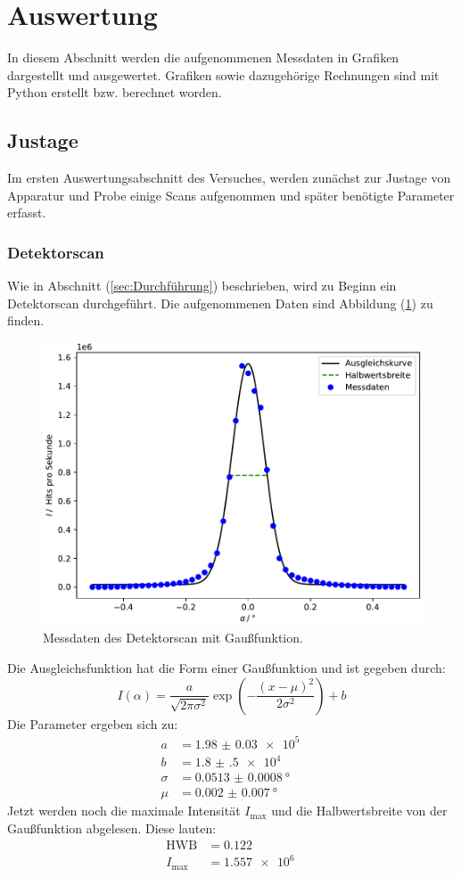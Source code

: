 \newpage
\section{Auswertung}
\label{sec:Auswertung}
In diesem Abschnitt werden die aufgenommenen Messdaten in Grafiken dargestellt und ausgewertet. Grafiken sowie dazugehörige Rechnungen sind mit Python \cite{python} erstellt bzw. berechnet worden.
\subsection{Justage}
Im ersten Auswertungsabschnitt des Versuches, werden zunächst zur Justage von Apparatur und Probe einige Scans aufgenommen und später benötigte Parameter erfasst.
\subsubsection{Detektorscan}
Wie in Abschnitt (\ref{sec:Durchführung}) beschrieben, wird zu Beginn ein Detektorscan durchgeführt. Die aufgenommenen Daten sind Abbildung (\ref{fig:detekscan}) zu finden.
\begin{figure}[h!]
  \centering
  \includegraphics[scale=0.7]{fig/plot_detektorscan.pdf}
  \caption{Messdaten des Detektorscan mit Gaußfunktion.}
  \label{fig:detekscan}
\end{figure}
Die Ausgleichsfunktion hat die Form einer Gaußfunktion und ist gegeben durch:
\begin{equation}
  \label{eqn:detektor}
  I(\alpha)=\dfrac{a}{\sqrt{2\pi\sigma^2}}\exp\left(-\dfrac{(x-\mu)^2}{2\sigma^2}\right)+b
\end{equation}
Die Parameter ergeben sich zu:
\begin{align*}
  a &= \SI{1.98(3) e5}{} \\
  b &= \SI{1.8(5) e4}{} \\
  \sigma &= \SI{0.0513(8)}{\degree} \\
  \mu &= \SI{0.002(7)}{\degree}
\end{align*}
Jetzt werden noch die maximale Intensität $I_\mathrm{max}$ und die Halbwertsbreite von der Gaußfunktion abgelesen. Diese lauten:
\begin{align*}
  \mathrm{HWB}&=0.122 \\
  I_\mathrm{max}&=\SI{1.557 e6}{}
\end{align*}

